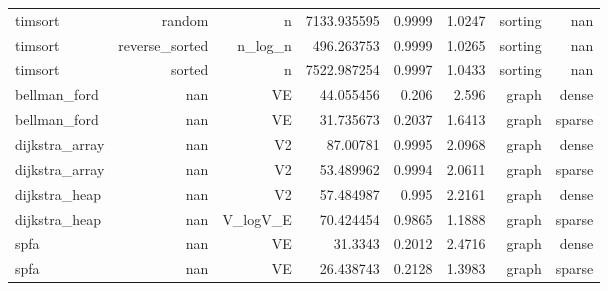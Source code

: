 \begin{table}[htbp]
\begin{tabular}{lrrrrrrr}
timsort & random & n & 7133.935595 & 0.9999 & 1.0247 & sorting & nan \\
timsort & reverse_sorted & n_log_n & 496.263753 & 0.9999 & 1.0265 & sorting & nan \\
timsort & sorted & n & 7522.987254 & 0.9997 & 1.0433 & sorting & nan \\
bellman_ford & nan & VE & 44.055456 & 0.206 & 2.596 & graph & dense \\
bellman_ford & nan & VE & 31.735673 & 0.2037 & 1.6413 & graph & sparse \\
dijkstra_array & nan & V2 & 87.00781 & 0.9995 & 2.0968 & graph & dense \\
dijkstra_array & nan & V2 & 53.489962 & 0.9994 & 2.0611 & graph & sparse \\
dijkstra_heap & nan & V2 & 57.484987 & 0.995 & 2.2161 & graph & dense \\
dijkstra_heap & nan & V_logV_E & 70.424454 & 0.9865 & 1.1888 & graph & sparse \\
spfa & nan & VE & 31.3343 & 0.2012 & 2.4716 & graph & dense \\
spfa & nan & VE & 26.438743 & 0.2128 & 1.3983 & graph & sparse \\
\hline
\end{tabular}
\end{table}

